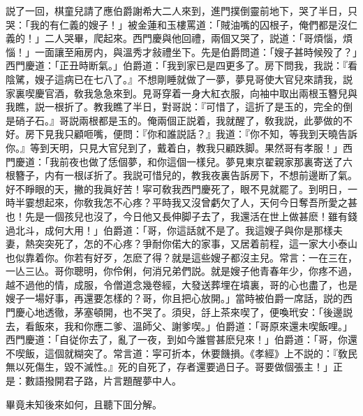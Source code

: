説了一回，棋童兒請了應伯爵謝希大二人來到，進門撲倒靈前地下，哭了半日，只哭：「我的有仁義的嫂子！」被金蓮和玉樓罵道：「賊油嘴的囚根子，俺們都是沒仁義的！」二人哭畢，爬起來。西門慶與他回禮，兩個又哭了，説道：「哥煩惱，煩惱！」一面讓至廂房内，與溫秀才敍禮坐下。先是伯爵問道：「嫂子甚時候殁了？」西門慶道：「正丑時断氣。」伯爵道：「我到家已是四更多了。房下問我，我説：『看陰騭，嫂子這病已在七八了。』不想剛睡就做了一夢，夢見哥使大官兒來請我，説家裏喫慶官酒，敎我急急來到。見哥穿着一身大紅衣服，向袖中取出兩根玉簪兒與我瞧，説一根折了。教我瞧了半日，對哥説：『可惜了，這折了是玉的，完全的倒是硝子石。』哥説兩根都是玉的。俺兩個正説着，我就醒了，敎我説，此夢做的不好。房下見我只顧咂嘴，便問：『你和誰説話？』我道：『你不知，等我到天曉告訴你。』等到天明，只見大官兒到了，戴着白，教我只顧跌脚。果然哥有孝服！」西門慶道：「我前夜也做了恁個夢，和你這個一樣兒。夢見東京翟親家那裏寄送了六根簪子，内有一根ぼ折了。我説可惜兒的，教我夜裏告訴房下，不想前邊断了氣。好不睜眼的天，撇的我眞好苦！寜可敎我西門慶死了，眼不見就罷了。到明日，一時半霎想起來，你敎我怎不心疼？平時我又沒曾虧欠了人，天何今日奪吾所愛之甚也！先是一個孩兒也沒了，今日他又長伸脚子去了，我還活在世上做甚麽！雖有錢過北斗，成何大用！」伯爵道：「哥，你這話就不是了。我這嫂子與你是那樣夫妻，熱突突死了，怎的不心疼？爭耐你偌大的家事，又居着前程，這一家大小泰山也似靠着你。你若有好歹，怎麽了得？就是這些嫂子都沒主兒。常言：一在三在，一亾三亾。哥你聰明，你伶俐，何消兄弟們説。就是嫂子他青春年少，你疼不過，越不過他的情，成服，令僧道念幾卷經，大發送葬埋在墳裏，哥的心也盡了，也是嫂子一場好事，再還要怎樣的？哥，你且把心放開。」當時被伯爵一席話，説的西門慶心地透徹，茅塞頓開，也不哭了。須臾，㧱上茶來喫了，便喚玳安：「後邊説去，看飯來，我和你應二爹、溫師父、謝爹喫。」伯爵道：「哥原來還未喫飯哩。」西門慶道：「自従你去了，亂了一夜，到如今誰嘗甚麽兒來！」伯爵道：「哥，你還不喫飯，這個就糊突了。常言道：寜可折本，休要饑損。《孝經》上不説的：『敎民無以死傷生，毀不滅性。』死的自死了，存者還要過日子。哥要做個張主！」正是：數語撥開君子路，片言題醒夢中人。

畢竟未知後來如何，且聽下囬分解。

